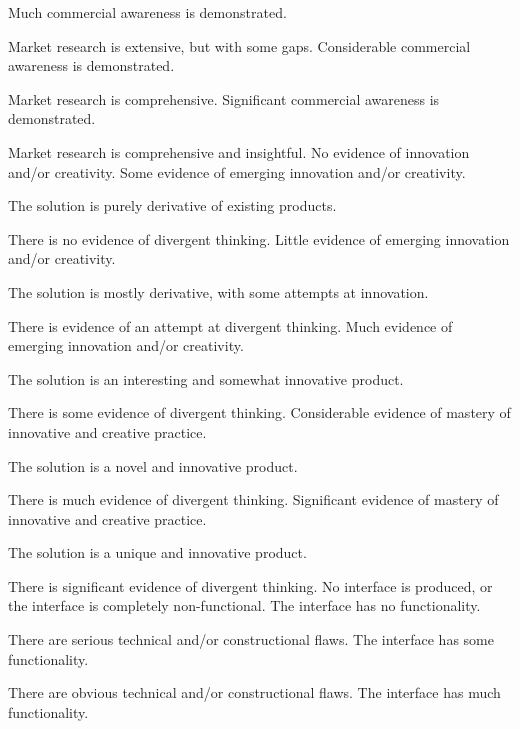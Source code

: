 \documentclass{../../fal_assignment}
\begin{document}
\begin{markingrubric}
        \grade Much commercial awareness is demonstrated.
            \par Market research is extensive, but with some gaps.
        \grade Considerable commercial awareness is demonstrated.
            \par Market research is comprehensive.
        \grade Significant commercial awareness is demonstrated.
            \par Market research is comprehensive and insightful.
%
        \grade\fail No evidence of innovation and/or creativity.
        \grade Some evidence of emerging innovation and/or creativity.
            \par The solution is purely derivative of existing products.
            \par There is no evidence of divergent thinking.
        \grade Little evidence of emerging innovation and/or creativity.
            \par The solution is mostly derivative, with some attempts at innovation.
            \par There is evidence of an attempt at divergent thinking.
        \grade Much evidence of emerging innovation and/or creativity.
            \par The solution is an interesting and somewhat innovative product.
            \par There is some evidence of divergent thinking.
        \grade Considerable evidence of mastery of innovative and creative practice.
            \par The solution is a novel and innovative product.
            \par There is much evidence of divergent thinking.
        \grade Significant evidence of mastery of innovative and creative practice.
            \par The solution is a unique and innovative product.
            \par There is significant evidence of divergent thinking.
%            
        \grade\fail No interface is produced, or the interface is completely non-functional.
        \grade The interface has no functionality.
            \par There are serious technical and/or constructional flaws.
        \grade The interface has some functionality.
            \par There are obvious technical and/or constructional flaws.
        \grade The interface has much functionality.

\end{markingrubric}
\end{document}
